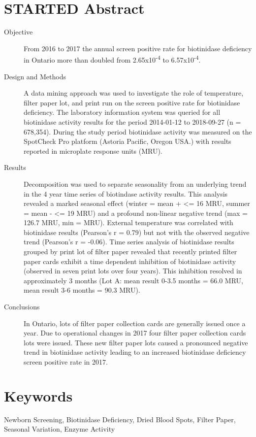 \documentclass[review]{elsarticle}
\begin{document}
\section*{STARTED Abstract}
\label{sec:org66658f3}
\begin{description}
\item[{Objective}] From 2016 to 2017 the annual screen positive rate for
biotinidase deficiency in Ontario more than doubled from
2.65x10\textsuperscript{-4} to 6.57x10\textsuperscript{-4}.

\item[{Design and Methods}] A data mining approach was used to investigate the role
of temperature, filter paper lot, and print run on the screen
positive rate for biotinidase deficiency. The laboratory information
system was queried for all biotinidase activity results for the
period 2014-01-12 to 2018-09-27 (n = 678,354). During the study
period biotinidase activity was measured on the SpotCheck Pro
platform (Astoria Pacific, Oregon USA.) with results reported in
microplate response units (MRU).

\item[{Results}] Decomposition was used to separate seasonality from an
underlying trend in the 4 year time series of biotindase activity
results. This analysis revealed a marked seasonal effect (winter =
mean + <= 16 MRU, summer = mean - <= 19 MRU) and a profound
non-linear negative trend (max = 126.7 MRU, min = MRU). External
temperature was correlated with biotinidase results (Pearson's r =
0.79) but not with the observed negative trend (Pearson's r =
-0.06). Time series analysis of biotinidase results grouped by print
lot of filter paper revealed that recently printed filter paper
cards exhibit a time dependent inhibition of biotinidase activity
(observed in seven print lots over four years). This inhibition
resolved in approximately 3 months (Lot A: mean result 0-3.5 months
= 66.0 MRU, mean result 3-6 months = 90.3 MRU).

\item[{Conclusions}] In Ontario, lots of filter paper collection cards are
generally issued once a year. Due to operational changes in 2017
four filter paper collection cards lots were issued. These new
filter paper lots caused a pronounced negative trend in biotinidase
activity leading to an increased biotinidase deficiency screen
positive rate in 2017.
\end{description}

\section*{Keywords}
\label{sec:org225e272}
Newborn Screening, Biotinidase Deficiency, Dried Blood Spots, Filter
Paper, Seasonal Variation, Enzyme Activity
\end{document}
